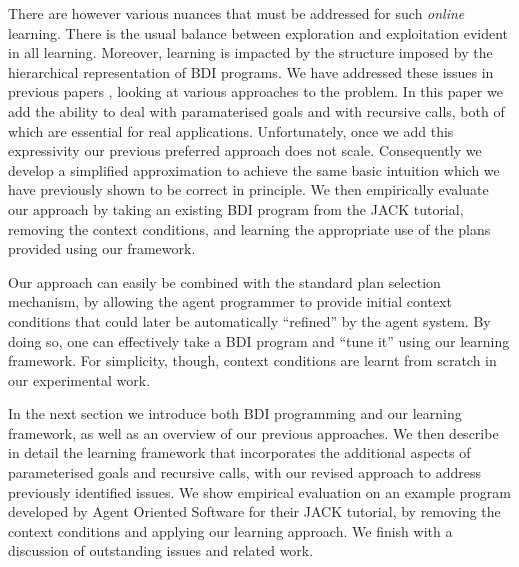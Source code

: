 There are however various nuances that must be addressed for such
\textit{online} learning. There is the usual balance between exploration and
exploitation evident in all learning. Moreover, learning is impacted by
the structure imposed by the hierarchical representation of BDI programs.
%
We have addressed these issues in previous papers
\cite{Airiau:IJAT:09,Singh:AAMAS10}, looking at various approaches to the
problem. In this paper we add the ability to deal with paramaterised
goals and with recursive calls, both of which are essential for real
applications. Unfortunately, once we add this expressivity our
previous preferred approach does not scale. Consequently we develop a
simplified approximation to achieve the same basic intuition which we
have previously shown to be correct in principle. We then
empirically evaluate our approach by
taking an existing BDI
program from the JACK tutorial, removing the context conditions, and 
learning the appropriate use of the plans provided
using our framework.

Our approach can easily be combined with the standard plan selection
mechanism, by allowing the agent programmer to provide initial context conditions
that could later be automatically ``refined'' by the agent system. By doing so,
one can effectively take a BDI program and ``tune it'' using our learning
framework.
For simplicity, though, context conditions are learnt from scratch in our
experimental work.

In the next section we introduce both
BDI programming and our learning framework, as well as an overview of
our previous approaches. We then describe in detail
the learning framework that incorporates the additional aspects of
parameterised goals and recursive calls, with our revised approach to
address previously identified issues.
We show empirical evaluation on an example program developed by
Agent Oriented Software for their JACK tutorial, by removing the context
conditions and applying our learning approach.  We finish with a
discussion of outstanding issues and related work.

%
